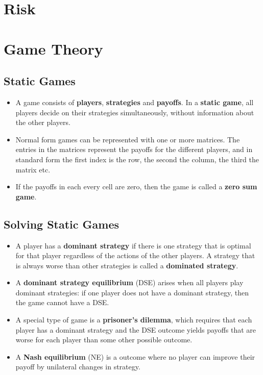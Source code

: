 \documentclass[a4paper]{article}
\begin{document}
\section{Risk}

\section{Game Theory}
\subsection{Static Games}
\begin{itemize}
    \item A game consists of \textbf{players}, \textbf{strategies} and \textbf{payoffs}. In a \textbf{static game}, all players decide on their strategies simultaneously, without information about the other players. 
    \item Normal form games can be represented with one or more matrices. The entries in the matrices represent the payoffs for the different players, and in standard form the first index is the row, the second the column, the third the matrix etc. 
    \item If the payoffs in each every cell are zero, then the game is called a \textbf{zero sum game}.
\end{itemize}

\subsection{Solving Static Games}
\begin{itemize}
    \item A player has a \textbf{dominant strategy} if there is one strategy that is optimal for that player regardless of the actions of the other players. A strategy that is always worse than other strategies is called a \textbf{dominated strategy}.
    \item A \textbf{dominant strategy equilibrium} (DSE) arises when all players play dominant strategies: if one player does not have a dominant strategy, then the game cannot have a DSE.
    \item A special type of game is a \textbf{prisoner's dilemma}, which requires that each player has a dominant strategy and the DSE outcome yields payoffs that are worse for each player than some other possible outcome.
    \item A \textbf{Nash equilibrium} (NE) is a outcome where no player can improve their payoff by unilateral changes in strategy.
\end{itemize}
\end{document}
